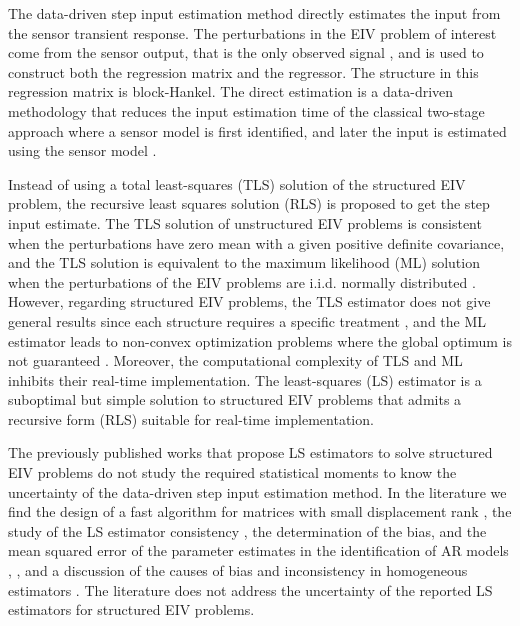 The data-driven step input estimation method directly estimates the input from the sensor transient response. 
The perturbations in the EIV problem of interest come from the sensor output, that is the only observed signal \citep{Markovsky15cep}, and is used to construct both the regression matrix and the regressor.
The structure in this regression matrix is block-Hankel.
The direct estimation is a data-driven methodology that reduces the input estimation time of the classical two-stage approach where a sensor model is first identified, and later the input is estimated using the sensor model \citep{Azam15, Niedzwiecki16a}.

Instead of using a total least-squares (TLS) solution of the structured EIV problem, the recursive least squares solution (RLS) is proposed to get the step input estimate. 
The TLS solution of unstructured EIV problems is consistent when the perturbations have zero mean with a given positive definite covariance, and
the TLS solution is equivalent to the maximum likelihood (ML) solution when the perturbations of the EIV problems are i.i.d. normally distributed \citep{Markovsky07overview}. 
However, regarding structured EIV problems, the TLS estimator does not give general results since each structure requires a specific treatment \citep{VanHuffel07TLSeditorial}, and the ML estimator leads to non-convex optimization problems where the global optimum is not guaranteed \citep{Rhode14recursive}.
Moreover, the computational complexity of TLS and ML inhibits their real-time implementation.
The least-squares (LS) estimator is a suboptimal but simple solution to structured EIV problems that admits a recursive form (RLS) suitable for real-time implementation.

The previously published works that propose LS estimators to solve structured EIV problems do not study the required statistical moments to know the uncertainty of the data-driven step input estimation method.
In the literature we find 
the design of a fast algorithm for matrices with small displacement rank \citep{Mastronardi07fast}, 
the study of the LS estimator consistency \citep{Palanthandalam10parameter},
the determination of the bias, and the mean squared error of the parameter estimates in the identification of AR models \citep{Kiviet12high}, \citep{Kiviet14improved}, and
a discussion of the causes of bias and inconsistency in homogeneous estimators \citep{Yeredor04homogeneous}.
The literature does not address the uncertainty of the reported LS estimators for structured EIV problems.

